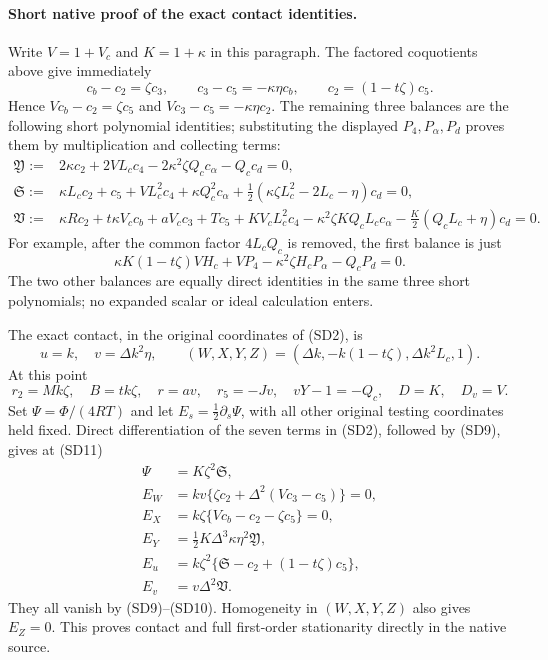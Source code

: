 \paragraph{Short native proof of the exact contact identities.}
Write $V=1+V_c$ and $K=1+\kappa$ in this paragraph. The factored
coquotients above give immediately
\[
 c_b-c_2=\zeta c_3,\qquad c_3-c_5=-\kappa\eta c_b,
 \qquad c_2=(1-t\zeta)c_5.                            \tag{SD9}
\]
Hence $Vc_b-c_2=\zeta c_5$ and
$Vc_3-c_5=-\kappa\eta c_2$.
The remaining three balances are the following short polynomial
identities; substituting the displayed $P_4,P_\alpha,P_d$ proves them
by multiplication and collecting terms:
\begin{align*}
\mathfrak Y:={}&2\kappa c_2+2VL_cc_4
                 -2\kappa^2\zeta Q_cc_\alpha-Q_cc_d=0,\\
\mathfrak S:={}&\kappa L_cc_2+c_5+VL_c^2c_4+\kappa Q_c^2c_\alpha
                 +\tfrac12(\kappa\zeta L_c^2-2L_c-\eta)c_d=0,\\
\mathfrak V:={}&\kappa Rc_2+t\kappa V_cc_b+aV_cc_3+Tc_5
 +KV_cL_c^2c_4-\kappa^2\zeta KQ_cL_cc_\alpha
 -\tfrac K2(Q_cL_c+\eta)c_d=0.                        \tag{SD10}
\end{align*}
For example, after the common factor $4L_cQ_c$ is removed,
the first balance is just
\[
 \kappa K(1-t\zeta)VH_c+VP_4
       -\kappa^2\zeta H_cP_\alpha-Q_cP_d=0.
\]
The two other balances are equally direct identities in the same three
short polynomials; no expanded scalar or ideal calculation enters.

The exact contact, in the original coordinates of (SD2), is
\[
 u=k,\quad v=\Delta k^2\eta,\qquad
 (W,X,Y,Z)=(\Delta k,-k(1-t\zeta),\Delta k^2L_c,1).      \tag{SD11}
\]
At this point
\[
 r_2=Mk\zeta,\quad B=tk\zeta,\quad r=av,\quad
 r_5=-Jv,\quad vY-1=-Q_c,\quad D=K,\quad D_v=V.
\]
Set $\Psi=\Phi/(4RT)$ and let $E_s=\tfrac12\partial_s\Psi$,
with all other original testing coordinates held fixed.
Direct differentiation of the seven terms in (SD2), followed by (SD9),
gives at (SD11)
\begin{align*}
 \Psi&=K\zeta^2\mathfrak S,\\
 E_W&=kv\{\zeta c_2+\Delta^2(Vc_3-c_5)\}=0,\\
 E_X&=k\zeta\{Vc_b-c_2-\zeta c_5\}=0,\\
 E_Y&=\tfrac12K\Delta^3\kappa\eta^2\mathfrak Y,\\
 E_u&=k\zeta^2\{\mathfrak S-c_2+(1-t\zeta)c_5\},\\
 E_v&=v\Delta^2\mathfrak V.
\end{align*}
They all vanish by (SD9)--(SD10). Homogeneity in $(W,X,Y,Z)$ also gives
$E_Z=0$. This proves contact and full first-order stationarity directly
in the native source.

